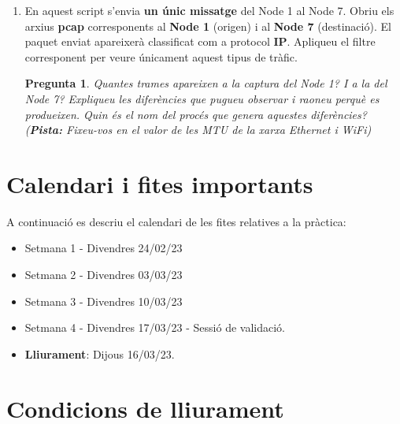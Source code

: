 \documentclass[12pt,a4paper]{article}
\newcounter{exercises}
\newtheorem{exer}[exercises]{Pregunta}
\begin{document}
\begin{enumerate}
\item En aquest script s'envia \textbf{un únic missatge} del Node 1 al Node 7. Obriu els arxius \textbf{pcap} corresponents al \textbf{Node 1} (origen) i al \textbf{Node 7} (destinació). El paquet enviat apareixerà classificat com a protocol \textbf{IP}. Apliqueu el filtre corresponent per veure únicament aquest tipus de tràfic.

\begin{exer} Quantes trames apareixen a la captura del Node 1? I a la del Node 7? Expliqueu les diferències que pugueu observar i raoneu perquè es produeixen. Quin és el nom del procés que genera aquestes diferències? (\textbf{Pista:} Fixeu-vos en el valor de les MTU de la xarxa Ethernet i WiFi) \end{exer}

\end{enumerate}




\section{Calendari i fites importants}

A continuació es descriu el calendari de les fites relatives a la pràctica:
\begin{itemize}
    
    \item Setmana 1 - Divendres 24/02/23
    \item Setmana 2 - Divendres 03/03/23
    \item Setmana 3 - Divendres 10/03/23
    \item Setmana 4 - Divendres 17/03/23 - Sessió de validació.
    \item \textbf{Lliurament}: Dijous 16/03/23.
\end{itemize}

\section{Condicions de lliurament}
\end{document}
